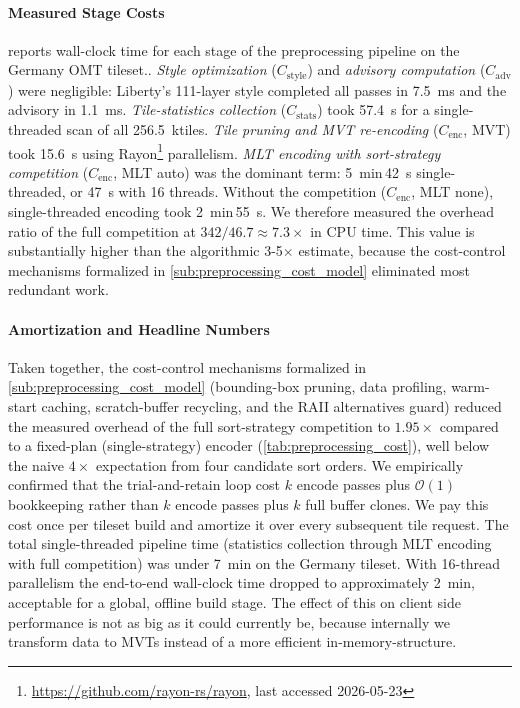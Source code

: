 \addtocounter{page}{-3}

\paragraph{Measured Stage Costs}
 reports wall-clock time for each stage of the preprocessing pipeline on the Germany \ac{OMT} tileset..
\emph{Style optimization} ($C_\text{style}$) and \emph{advisory computation} ($C_\text{adv}$) were negligible: Liberty's 111-layer style completed all passes in \qty{7.5}{\milli\second} and the advisory in \qty{1.1}{\milli\second}.
\emph{Tile-statistics collection} ($C_\text{stats}$) took \qty{57.4}{\second} for a single-threaded scan of all \qty{256.5}{\kilo tiles}.
\emph{Tile pruning and \ac{MVT} re-encoding} ($C_\text{enc}$, MVT) took \qty{15.6}{\second} using Rayon\footnote{\url{https://github.com/rayon-rs/rayon}, last accessed 2026-05-23} parallelism.
\emph{\ac{MLT} encoding with sort-strategy competition} ($C_\text{enc}$, \ac{MLT} auto) was the dominant term: \qty{5}{\minute}\,\qty{42}{\second} single-threaded, or \qty{47}{\second} with 16 threads.
Without the competition ($C_\text{enc}$, \ac{MLT} none), single-threaded encoding took \qty{2}{\minute}\,\qty{55}{\second}.
We therefore measured the overhead ratio of the full competition at $342 / 46.7 \approx 7.3\times$ in \ac{CPU} time.
This value is substantially higher than the algorithmic 3-5$\times$ estimate, because the cost-control mechanisms formalized in \cref{sub:preprocessing_cost_model} eliminated most redundant work.

\paragraph{Amortization and Headline Numbers}
Taken together, the cost-control mechanisms formalized in \cref{sub:preprocessing_cost_model} (bounding-box pruning, data profiling, warm-start caching, scratch-buffer recycling, and the \ac{RAII} alternatives guard) reduced the measured overhead of the full sort-strategy competition to $1.95\times$ compared to a fixed-plan (single-strategy) encoder (\cref{tab:preprocessing_cost}), well below the naive $4\times$ expectation from four candidate sort orders.
We empirically confirmed that the trial-and-retain loop cost $k$ encode passes plus $\mathcal{O}(1)$ bookkeeping rather than $k$ encode passes plus $k$ full buffer clones.
We pay this cost once per tileset build and amortize it over every subsequent tile request.
The total single-threaded pipeline time (statistics collection through \ac{MLT} encoding with full competition) was under \qty{7}{\minute} on the Germany tileset.
With 16-thread parallelism the end-to-end wall-clock time dropped to approximately \qty{2}{\minute}, acceptable for a global, offline build stage.
The effect of this on client side performance is not as big as it could currently be, because internally we transform data to \acsp{MVT} instead of a more efficient in-memory-structure.

